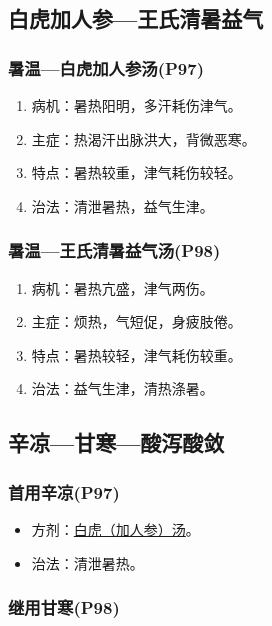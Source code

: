 \documentclass[cn,black,12pt,founder,normal,twocolumn]{elegantnote}
\begin{document}
\subsection{白虎加人参—王氏清暑益气}

\subsubsection{暑温—白虎加人参汤(P97)}

\begin{enumerate}
    \item 病机：暑热阳明，多汗耗伤津气。
    \item 主症：热渴汗出脉洪大，背微恶寒。
    \item 特点：暑热较重，津气耗伤较轻。
    \item 治法：清泄暑热，益气生津。
\end{enumerate}

\subsubsection{暑温—王氏清暑益气汤(P98)}

\begin{enumerate}
    \item 病机：暑热亢盛，津气两伤。
    \item 主症：烦热，气短促，身疲肢倦。
    \item 特点：暑热较轻，津气耗伤较重。
    \item 治法：益气生津，清热涤暑。
\end{enumerate}

\subsection{辛凉—甘寒—酸泻酸敛}

\subsubsection{首用辛凉(P97)}

\begin{itemize}
    \item 方剂：\uline{白虎（加人参）汤}。
    \item 治法：清泄暑热。
\end{itemize}

\subsubsection{继用甘寒(P98)}
\end{document}
